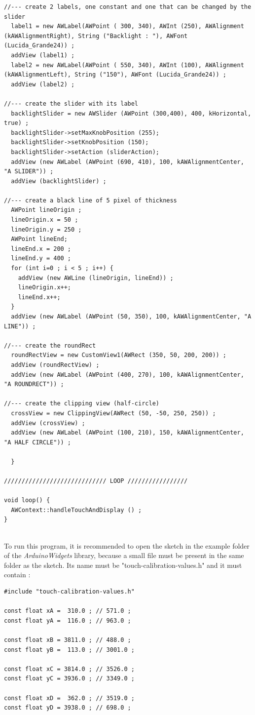 \documentclass[a4paper,11pt]{extarticle}
\begin{document}
\begin{lstlisting}[language=Arduino]
//--- create 2 labels, one constant and one that can be changed by the slider 
  label1 = new AWLabel(AWPoint ( 300, 340), AWInt (250), AWAlignment (kAWAlignmentRight), String ("Backlight : "), AWFont (Lucida_Grande24)) ;
  addView (label1) ;
  label2 = new AWLabel(AWPoint ( 550, 340), AWInt (100), AWAlignment (kAWAlignmentLeft), String ("150"), AWFont (Lucida_Grande24)) ;
  addView (label2) ;

//--- create the slider with its label
  backlightSlider = new AWSlider (AWPoint (300,400), 400, kHorizontal, true) ;
  backlightSlider->setMaxKnobPosition (255);
  backlightSlider->setKnobPosition (150);
  backlightSlider->setAction (sliderAction);
  addView (new AWLabel (AWPoint (690, 410), 100, kAWAlignmentCenter, "A SLIDER")) ;
  addView (backlightSlider) ;

//--- create a black line of 5 pixel of thickness
  AWPoint lineOrigin ;
  lineOrigin.x = 50 ;
  lineOrigin.y = 250 ;
  AWPoint lineEnd;
  lineEnd.x = 200 ;
  lineEnd.y = 400 ;
  for (int i=0 ; i < 5 ; i++) {
    addView (new AWLine (lineOrigin, lineEnd)) ;
    lineOrigin.x++;
    lineEnd.x++;
  }
  addView (new AWLabel (AWPoint (50, 350), 100, kAWAlignmentCenter, "A LINE")) ;

//--- create the roundRect
  roundRectView = new CustomView1(AWRect (350, 50, 200, 200)) ;
  addView (roundRectView) ;   
  addView (new AWLabel (AWPoint (400, 270), 100, kAWAlignmentCenter, "A ROUNDRECT")) ;

//--- create the clipping view (half-circle)
  crossView = new ClippingView(AWRect (50, -50, 250, 250)) ;
  addView (crossView) ;
  addView (new AWLabel (AWPoint (100, 210), 150, kAWAlignmentCenter, "A HALF CIRCLE")) ;
  
  }

///////////////////////////// LOOP /////////////////

void loop() {
  AWContext::handleTouchAndDisplay () ;
}
\end{lstlisting}

~\\ To run this program, it is recommended to open the sketch in the example folder of the \emph{ArduinoWidgets} library, because a small file must be present in the same folder as the sketch. Its name must be "touch-calibration-values.h" and it must contain :

\begin{lstlisting}[language=Arduinonl]
#include "touch-calibration-values.h"

const float xA =  310.0 ; // 571.0 ;
const float yA =  116.0 ; // 963.0 ;

const float xB = 3811.0 ; // 488.0 ;
const float yB =  113.0 ; // 3001.0 ;

const float xC = 3814.0 ; // 3526.0 ;
const float yC = 3936.0 ; // 3349.0 ;

const float xD =  362.0 ; // 3519.0 ;
const float yD = 3938.0 ; // 698.0 ;
\end{lstlisting}
\end{document}
